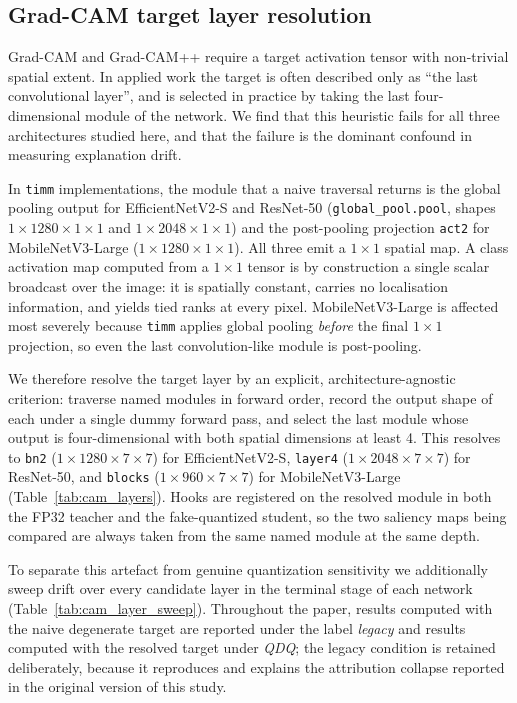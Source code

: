 \documentclass[fleqn,10pt]{wlscirep}
\begin{document}
\subsection*{Grad-CAM target layer resolution}

Grad-CAM and Grad-CAM++ require a target activation tensor with non-trivial spatial extent. In applied work the target is often described only as ``the last convolutional layer'', and is selected in practice by taking the last four-dimensional module of the network. We find that this heuristic fails for all three architectures studied here, and that the failure is the dominant confound in measuring explanation drift.

In \texttt{timm} implementations, the module that a naive traversal returns is the global pooling output for EfficientNetV2-S and ResNet-50 (\texttt{global\_pool.pool}, shapes $1 \times 1280 \times 1 \times 1$ and $1 \times 2048 \times 1 \times 1$) and the post-pooling projection \texttt{act2} for MobileNetV3-Large ($1 \times 1280 \times 1 \times 1$). All three emit a $1 \times 1$ spatial map. A class activation map computed from a $1 \times 1$ tensor is by construction a single scalar broadcast over the image: it is spatially constant, carries no localisation information, and yields tied ranks at every pixel. MobileNetV3-Large is affected most severely because \texttt{timm} applies global pooling \emph{before} the final $1 \times 1$ projection, so even the last convolution-like module is post-pooling.

We therefore resolve the target layer by an explicit, architecture-agnostic criterion: traverse named modules in forward order, record the output shape of each under a single dummy forward pass, and select the last module whose output is four-dimensional with both spatial dimensions at least 4. This resolves to \texttt{bn2} ($1 \times 1280 \times 7 \times 7$) for EfficientNetV2-S, \texttt{layer4} ($1 \times 2048 \times 7 \times 7$) for ResNet-50, and \texttt{blocks} ($1 \times 960 \times 7 \times 7$) for MobileNetV3-Large (Table~\ref{tab:cam_layers}). Hooks are registered on the resolved module in both the FP32 teacher and the fake-quantized student, so the two saliency maps being compared are always taken from the same named module at the same depth.

To separate this artefact from genuine quantization sensitivity we additionally sweep drift over every candidate layer in the terminal stage of each network (Table~\ref{tab:cam_layer_sweep}). Throughout the paper, results computed with the naive degenerate target are reported under the label \emph{legacy} and results computed with the resolved target under \emph{QDQ}; the legacy condition is retained deliberately, because it reproduces and explains the attribution collapse reported in the original version of this study.
\end{document}
